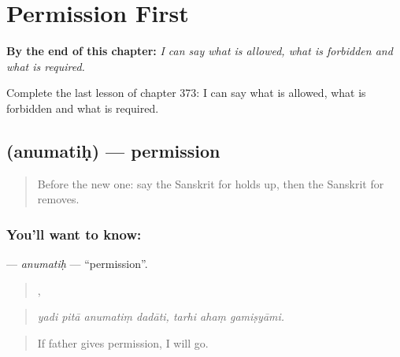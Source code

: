 
\chapter{Permission First}
\label{ch:sa-permission-first}

\begin{chapteropening}
\textbf{By the end of this chapter:} \emph{I can say what is allowed, what is forbidden and what is required.}

Complete the last lesson of chapter 373: I can say what is allowed, what is forbidden and what is required.
\end{chapteropening}

\section[\texorpdfstring{\sk{अनुमतिः} (anumatiḥ)}{अनुमतिः (anumatiḥ)}]{ (anumatiḥ) — permission}

\label{lesson:SA-C373-anumatih}



\begin{quote}
Before the new one: say the Sanskrit for holds up, then the Sanskrit for removes.
\end{quote}

\subsection*{You'll want to know: }
\textbf{} — \emph{anumatiḥ} — \textquotedblleft{}permission\textquotedblright{}.

\begin{quote}
   ,   
\end{quote}

\begin{quote}
\emph{yadi pitā anumatiṃ dadāti, tarhi ahaṃ gamiṣyāmi.}
\end{quote}

\begin{quote}
If father gives permission, I will go.
\end{quote}

